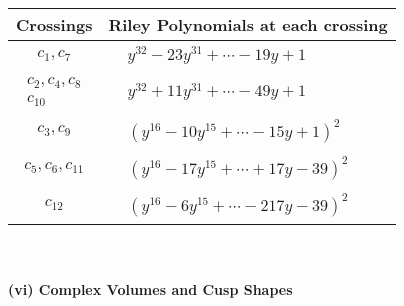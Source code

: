 \documentclass[1p]{elsarticle_modified}
\theoremstyle{definition}
\begin{document}
\begin{tabular}{m{50pt}|m{274pt}}
Crossings & \hspace{64pt}Riley Polynomials at each crossing \\
\hline $$\begin{aligned}c_{1},c_{7}\end{aligned}$$&$\begin{aligned}
&y^{32}-23 y^{31}+\cdots-19 y+1
\end{aligned}$\\
\hline $$\begin{aligned}c_{2},c_{4},c_{8}\\c_{10}\end{aligned}$$&$\begin{aligned}
&y^{32}+11 y^{31}+\cdots-49 y+1
\end{aligned}$\\
\hline $$\begin{aligned}c_{3},c_{9}\end{aligned}$$&$\begin{aligned}
&(y^{16}-10 y^{15}+\cdots-15 y+1)^{2}
\end{aligned}$\\
\hline $$\begin{aligned}c_{5},c_{6},c_{11}\end{aligned}$$&$\begin{aligned}
&(y^{16}-17 y^{15}+\cdots+17 y-39)^{2}
\end{aligned}$\\
\hline $$\begin{aligned}c_{12}\end{aligned}$$&$\begin{aligned}
&(y^{16}-6 y^{15}+\cdots-217 y-39)^{2}
\end{aligned}$\\
\hline
\end{tabular}\\~\\
\newpage\flushleft \textbf{(vi) Complex Volumes and Cusp Shapes}
\end{document}
